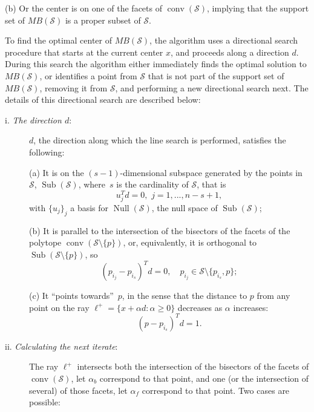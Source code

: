 \begin{description}
	(b) Or the center is on one of the facets of ${\operatorname{conv}}({\mathcal{S}})$, implying that the support set of $MB({\mathcal{S}})$ is a proper subset of ${\mathcal{S}}$.
	
	\medskip
	
	To find the optimal center of $MB({\mathcal{S}})$, the algorithm uses a directional search procedure that starts at the current center $x$, and proceeds along a direction $d$. During this search the algorithm either immediately finds the optimal solution to $MB({\mathcal{S}})$, or identifies a point from ${\mathcal{S}}$ that is not part of the support set of $MB({\mathcal{S}})$, removing it from ${\mathcal{S}}$, and performing a new directional search next. The details of this directional search are described below:
	
	\smallskip
	
	\begin{description}
		\item [i. \emph{The direction $d$}: ] $d$, the direction along which the line search is performed, satisfies the following:
		
		(a) It is on the $(s-1)$-dimensional subspace generated by the points in ${\mathcal{S}}$, ${\operatorname{Sub}}({\mathcal{S}})$, where~$s$ is the cardinality of ${\mathcal{S}}$, that is
		$$u_j^Td = 0,\,\, j=1,...,n-s+1,$$
		\noindent with $\{u_j\}_j$ a basis for ${\operatorname{Null}}({\mathcal{S}})$, the null space of ${\operatorname{Sub}}({\mathcal{S}})$;
		
		(b) It is parallel to the intersection of the bisectors of the facets of the polytope ${\operatorname{conv}}({\mathcal{S}}\setminus\{{{p}}\})$, or, equivalently, it is orthogonal to ${\operatorname{Sub}}({\mathcal{S}}\setminus\{{{p}}\})$, so
		$$(p_{i_j}-p_{i_s})^Td=0,\quad p_{i_j}\in{\mathcal{S}}\setminus\{p_{i_s},{{p}}\};$$
		
		(c) It ``points towards''  $\,{{p}}$, in the sense that the distance to ${{p}}$ from any point on the ray $\ell^+ = \{x+\alpha d: \alpha \geq 0\}$ decreases as $\alpha$ increases:
		$$(p-p_{i_s})^Td=1.$$
		
		\medskip
		
		\item [ii. \emph{Calculating the next iterate}: ] The ray $\ell^+$ intersects both the intersection of the bisectors of the facets of ${\operatorname{conv}} ({\mathcal{S}})$, let $\alpha_b$ correspond to that point, and one (or the intersection of several) of those facets, let $\alpha_f$ correspond to that point. Two cases are possible:
		

\end{description}
\end{description}

